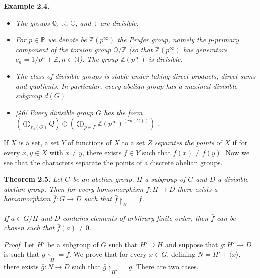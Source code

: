 \documentclass[12pt]{article}
\begin{document}
\textbf{Example 2.4.}


    \begin{itemize}

        \item \emph{The groups $ \mathbb{Q} $, $ \mathbb{R} $, $ \mathbb{C} $, and $ \mathbb{T} $ are divisible.}

        \item \emph{For $ p \in \mathbb{P} $ we denote be $ \mathbb{Z} (p^{\infty}) $ the Prufer group, namely the $p$-primary component of the torsion group
        $ \mathbb{Q} / \mathbb{Z} $ (so that $ \mathbb{Z} (p^{\infty})$ has generators $ c_n = 1/p^{n} + \mathbb{Z}, n \in \mathbb{N} $). The group $ \mathbb{Z}(p^{\infty}) $ is divisible.}

        \item \emph{The class of divisible groups is stable under taking direct products, direct sums and quotients.
        In particular, every abelian group has a maximal divisible subgroup $d(G)$.}

        \item \emph{[46] Every divisible group $ G $ has the form $(\bigoplus_{ r_{0} (G) } Q) \oplus (\bigoplus_{p \in P} \mathbb{Z} (p^{\infty})^ {(rp(G))} )$ .}

    \end{itemize}


    If $X$ is a set, a set $Y$ of functions of $X$ to a set $Z$ \emph{separates the points} of $X$ if for every $x, y \in X$ with $x \neq y$,
there exists $f \in Y$ such that $f(x) \neq f(y)$. Now we see that the characters separate the points of a discrete
abelian groups.


\textbf{Theorem 2.5.} \emph{Let $ G $ be an abelian group, $ H $ a subgroup of $ G $ and $ D $ a divisible abelian group. Then for every
homomorphism $ f : H \to D $ there exists a homomorphism $ \bar{f} : G \to D $ such that $ \bar{f} \upharpoonright_{H} = f $.}


    \emph{If $ a \in G / H $ and $ D $ contains elements of arbitrary finite order, then $ \bar{f} $ can be chosen such that $ \bar{f} (a) \neq 0 $.}


    \emph{Proof}. Let $ H' $ be a subgroup of $ G $ such that $H' \supseteq H $ and suppose that $ g : H' \to D $ is such that $ g \upharpoonright_{H} = f $. We
prove that for every $ x \in G $, defining $ N = H' + \langle x \rangle $, there exists $ \bar{g} : N \to D $ such that  $ \bar{g} \upharpoonright_{H'} = g $. There are two
cases.
\end{document}
